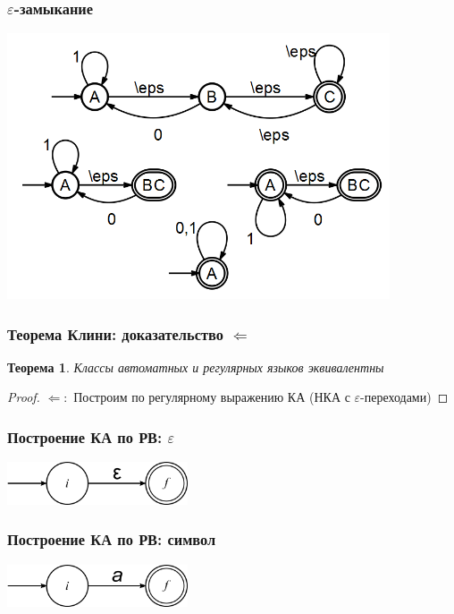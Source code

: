 \documentclass{beamer}
\newtheorem{rutheorem}{Теорема}
\begin{document}
\begin{frame}
  \transwipe[direction=90]
  \frametitle{$\varepsilon$-замыкание}
  \begin{center}
    \includegraphics[width=0.85\textwidth]{pics/epsclosure.png}  
  \end{center}
 \end{frame}
 
\begin{frame}
  \transwipe[direction=90]
  \frametitle{Теорема Клини: доказательство $\Leftarrow$}
  
  \begin{rutheorem}
   Классы автоматных и регулярных языков \emph{эквивалентны}
  \end{rutheorem}
  
  \begin{proof}
    $\Leftarrow:$ Построим по регулярному выражению КА (НКА с $\varepsilon$-переходами)
  \end{proof}
\end{frame}

\begin{frame}
  \transwipe[direction=90]
  \frametitle{Построение КА по РВ: $\varepsilon$}
    \begin{center}
      \includegraphics[width=0.40\textwidth]{pics/epsilon.png}  
    \end{center}
\end{frame}

\begin{frame}
  \transwipe[direction=90]
  \frametitle{Построение КА по РВ: символ}
    \begin{center}
      \includegraphics[width=0.40\textwidth]{pics/terminal.png}  
    \end{center}
\end{frame}
\end{document}
